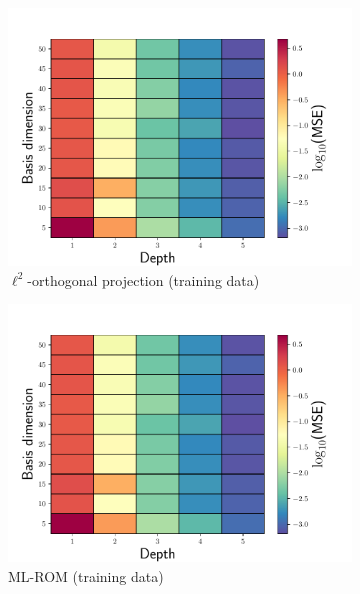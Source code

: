 \documentclass[3p,computermodern,10pt]{elsarticle}
\begin{document}
\begin{figure}
\begin{center}
\begin{subfigure}[t]{0.49\textwidth}
\includegraphics[trim={0cm 0cm 0cm 0cm},clip,width=1.0\linewidth]{code/burgers/synapse_models/basis_study/MSE_training.pdf}
\caption{$\ell^2$-orthogonal projection (training data)}
\end{subfigure}
\begin{subfigure}[t]{0.49\textwidth}
\includegraphics[trim={0cm 0cm 0cm 0cm},clip,width=1.0\linewidth]{code/burgers/synapse_models/basis_study/MSE_training.pdf}
\caption{ML-ROM (training data)}
\end{subfigure}
\begin{subfigure}[t]{0.49\textwidth}

\end{subfigure}
\end{center}
\end{figure}
\end{document}
